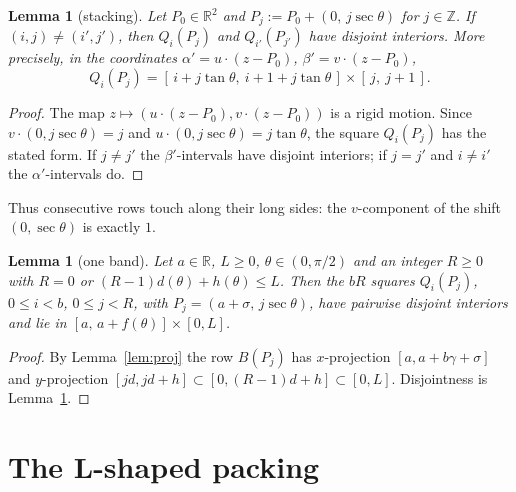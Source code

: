 \documentclass[11pt]{amsart}
\newcommand{\R}{\mathbb R}
\newcommand{\Z}{\mathbb Z}
\newtheorem{lemma}[theorem]{Lemma}
\theoremstyle{definition}
\theoremstyle{remark}
\numberwithin{equation}{section}
\begin{document}
\begin{lemma}[stacking]\label{lem:stack}
Let $P_0\in\R^2$ and $P_j:=P_0+(0,\,j\sec\theta)$ for $j\in\Z$. If $(i,j)\ne(i',j')$, then $Q_i(P_j)$ and
$Q_{i'}(P_{j'})$ have disjoint interiors. More precisely, in the coordinates $\alpha'=u\cdot(z-P_0)$,
$\beta'=v\cdot(z-P_0)$,
\[
Q_i(P_j)=[\,i+j\tan\theta,\ i+1+j\tan\theta\,]\times[\,j,\ j+1\,].
\]
\end{lemma}

\begin{proof}
The map $z\mapsto(u\cdot(z-P_0),v\cdot(z-P_0))$ is a rigid motion. Since $v\cdot(0,j\sec\theta)=j$ and
$u\cdot(0,j\sec\theta)=j\tan\theta$, the square $Q_i(P_j)$ has the stated form. If $j\ne j'$ the $\beta'$-intervals have
disjoint interiors; if $j=j'$ and $i\ne i'$ the $\alpha'$-intervals do.
\end{proof}

Thus consecutive rows touch along their long sides: the $v$-component of the shift $(0,\sec\theta)$ is exactly $1$.

\begin{lemma}[one band]\label{lem:band}
Let $a\in\R$, $L\ge0$, $\theta\in(0,\pi/2)$ and an integer $R\ge0$ with $R=0$ or $(R-1)d(\theta)+h(\theta)\le L$. Then the
$bR$ squares $Q_i(P_j)$, $0\le i<b$, $0\le j<R$, with $P_j=(a+\sigma,\,j\sec\theta)$, have pairwise disjoint interiors
and lie in $[a,\,a+f(\theta)]\times[0,L]$.
\end{lemma}

\begin{proof}
By Lemma~\ref{lem:proj} the row $B(P_j)$ has $x$-projection $[a,a+b\gamma+\sigma]$ and $y$-projection
$[jd,jd+h]\subset[0,(R-1)d+h]\subset[0,L]$. Disjointness is Lemma~\ref{lem:stack}.
\end{proof}

\section{The L-shaped packing}\label{sec:lshape}
\end{document}
